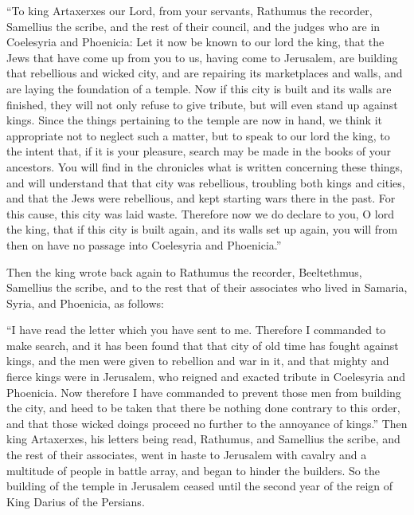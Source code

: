  ``To king Artaxerxes our Lord, from your servants,
Rathumus the recorder, Samellius the scribe, and the rest of their
council, and the judges who are in Coelesyria and Phoenicia:
 Let it now be known to our lord the king, that the Jews
that have come up from you to us, having come to Jerusalem, are building
that rebellious and wicked city, and are repairing its marketplaces and
walls, and are laying the foundation of a temple.  Now if
this city is built and its walls are finished, they will not only refuse
to give tribute, but will even stand up against kings. 
Since the things pertaining to the temple are now in hand, we think it
appropriate not to neglect such a matter,  but to speak to
our lord the king, to the intent that, if it is your pleasure, search
may be made in the books of your ancestors.  You will find
in the chronicles what is written concerning these things, and will
understand that that city was rebellious, troubling both kings and
cities,  and that the Jews were rebellious, and kept
starting wars there in the past. For this cause, this city was laid
waste.  Therefore now we do declare to you, O lord the
king, that if this city is built again, and its walls set up again, you
will from then on have no passage into Coelesyria and Phoenicia.''

 Then the king wrote back again to Rathumus the recorder,
Beeltethmus, Samellius the scribe, and to the rest that of their
associates who lived in Samaria, Syria, and Phoenicia, as follows:

 ``I have read the letter which you have sent to me.
Therefore I commanded to make search, and it has been found that that
city of old time has fought against kings,  and the men
were given to rebellion and war in it, and that mighty and fierce kings
were in Jerusalem, who reigned and exacted tribute in Coelesyria and
Phoenicia.  Now therefore I have commanded to prevent those
men from building the city, and heed to be taken that there be nothing
done contrary to this order,  and that those wicked doings
proceed no further to the annoyance of kings.''  Then king
Artaxerxes, his letters being read, Rathumus, and Samellius the scribe,
and the rest of their associates, went in haste to Jerusalem with
cavalry and a multitude of people in battle array, and began to hinder
the builders. So the building of the temple in Jerusalem ceased until
the second year of the reign of King Darius of the Persians.


